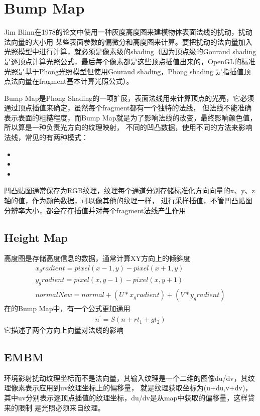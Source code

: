 \section{Bump Map}

Jim Blinn在1978的论文中使用一种灰度高度图来建模物体表面法线的扰动，扰动法向量的大小用
某些表面参数的偏微分和高度图来计算。要把扰动的法向量加入光照模型中进行计算，就必须是像素级的shading（因为顶点级的Gouraud shading
是逐顶点计算光照公式，最后每个像素都是这些顶点插值出来的，OpenGL的标准光照是基于Phong光照模型但使用Gouraud shading，Phong shading
是指插值顶点法向量在fragment基本计算光照公式）。

Bump Map是Phong Shading的一项扩展，表面法线用来计算顶点的光亮，它必须通过顶点插值来确定，虽然每个fragment都有一个独特的法线，
但法线不能准确表示表面的粗糙程度，而Bump Map就是为了影响法线的改变，最终影响颜色值，所以算是一种负责光方向的纹理映射，
不同的凹凸数据，使用不同的方法来影响法线，常见的有两种模式：
\begin{itemize}
    \item {}
    \item {}
    \item {}
\end{itemize}

凹凸贴图通常保存为RGB纹理，纹理每个通道分别存储标准化方向向量的x、y、z轴的值，作为颜色数据，可以像其他的纹理一样，
进行采样插值，不管凹凸贴图分辨率大小，都会存在插值并对每个fragment法线产生作用

\subsection{Height Map}
高度图是存储高度信息的数据，通常计算XY方向上的倾斜度
\begin{gather*}
    x_gradient = pixel(x-1,y) - pixel(x+1,y) \\
    y_gradient = pixel(x,y-1) - pixel(x,y+1) \\
    normalNew = normal + (U * x_gradient) + (V * y_gradient)
\end{gather*}
在的Bump Map\cite{CGPP3ed}中，有一个公式更加通用
\begin{align*}
    n^{'} = S(n + rt_{1} + gt_{2})
\end{align*}
它描述了两个方向上向量对法线的影响

\subsection{EMBM}
环境影射扰动纹理坐标而不是法向量，其输入纹理是一个二维的图像du/dv，其纹理像素表示应用到uv纹理坐标上的偏移量，
就是纹理获取坐标为(u+du,v+dv)，其中uv分别表示逐顶点插值的纹理坐标，du/dv是从map中获取的偏移量，这样贷来的限制
是光照必须来自纹理。


